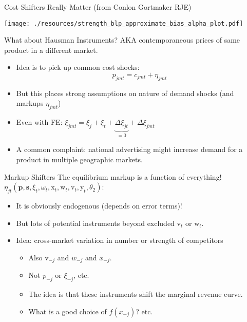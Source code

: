 \begin{frame}{Cost Shifters Really Matter (from Conlon Gortmaker RJE)}
\begin{center}
    \texttt{[image: ./resources/strength\_blp\_approximate\_bias\_alpha\_plot.pdf]}
\end{center}
\end{frame}


\begin{frame}{What about Hausman Instruments?}
AKA contemporaneous prices of same product in a different market.
\begin{itemize}
    \item Idea is to pick up common cost shocks:
     $$p_{jmt} = c_{jmt} + \eta_{jmt}$$
     \item But this places strong assumptions on nature of demand shocks (and markups $ \eta_{jmt}$)
     \item Even with FE: $\xi_{jmt} = \xi_j + \xi_t + \underbrace{\Delta \xi_{jt}}_{=0} + \Delta \xi_{jmt}$
     \item A common complaint: national advertising might increase demand for a product in multiple geographic markets.
\end{itemize}
\end{frame}



\begin{frame}{Markup Shifters}
The equilibrium markup is a function of \alert{everything!} $\eta_{jt}(\mathbf{p},\mathbf{s},\xi_t,\omega_t,\textrm{x}_{t},\textrm{w}_{t},\textrm{v}_t,\textrm{y}_t,\theta_2)$:
\begin{itemize}
\item It is obviously \alert{endogenous} (depends on error terms)!
\item But lots of potential instruments beyond \alert{excluded} $\textrm{v}_t$ or $\textrm{w}_t$.
\item Idea: cross-market variation in number or strength of competitors
\begin{itemize}
\item Also $\textrm{v}_{-j}$ and $w_{-j}$ and $x_{-j}$.
\item Not $p_{-j}$ or $\xi_{-j}$, etc.
\item The idea is that these instruments shift the \alert{marginal revenue curve}.
\item What is a good choice of $f(x_{-j})$? etc.
\end{itemize}
\end{itemize}
\end{frame}




